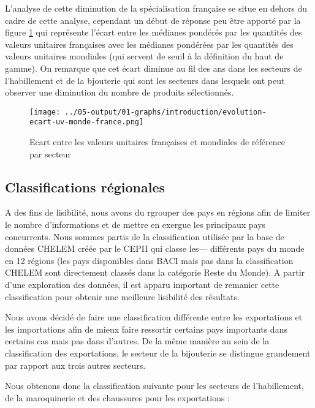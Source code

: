 \documentclass[french,10pt,a4paper]{article}
\begin{document}
L'analyse de cette diminution de la spécialisation française se situe en dehors du cadre de cette analyse, cependant un début de réponse peu être apporté par la figure \ref{fig:evolution-ecart-uv-monde-france} qui représente l'écart entre les médianes pondérés par les quantités des valeurs unitaires françaises avec les médianes pondérées par les quantités des valeurs unitaires mondiales (qui servent de seuil à la définition du haut de gamme). On remarque que cet écart diminue au fil des ans dans les secteurs de l'habillement et de la bjouterie qui sont les secteurs dans lesquels ont peut observer une diminution du nombre de produits sélectionnés.  

\begin{figure}[!h]
  \centering \texttt{[image: ../05-output/01-graphs/introduction/evolution-ecart-uv-monde-france.png]}
  \caption{Ecart entre les valeurs unitaires françaises et mondiales de référence par secteur}
  \label{fig:evolution-ecart-uv-monde-france}
\end{figure}

\subsection{Classifications régionales}

A des fins de lisibilité, nous avons du rgrouper des pays en régions afin de limiter le nombre d'informations et de mettre en exergue les principaux pays concurrents. Nous sommes partis de la classification utilisée par la base de données CHELEM créée par le CEPII \citep{SaintVaulry2008} qui classe les--- différents pays du monde en 12 régions (les pays disponibles dans BACI mais pas dans la classification CHELEM sont directement classés dans la catégorie \og Reste du Monde\fg{}). A partir d'une exploration des données, il est apparu important de remanier cette classification pour obtenir une meilleure lisibilité des résultats.

Nous avons décidé de faire une classification différente entre les exportations et les importations afin de mieux faire ressortir certains pays importants dans certains cas mais pas dans d'autres. De la même manière au sein de la classification des exportations, le secteur de la bijouterie se distingue grandement par rapport aux trois autres secteurs.

Nous obtenons donc la classification suivante pour les secteurs de l'habillement, de la maroquinerie et des chaussures pour les exportations :
\end{document}
